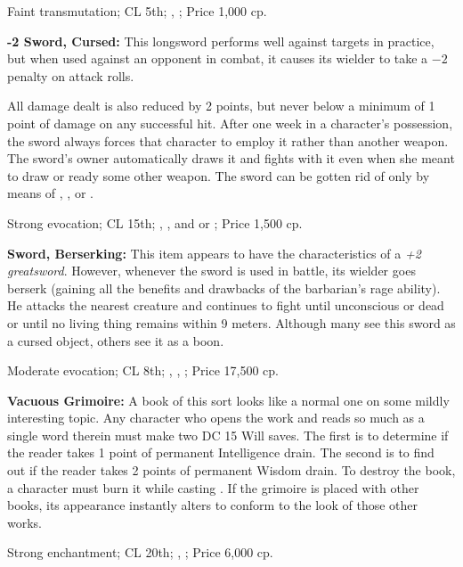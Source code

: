 Faint transmutation; CL 5th; , ; Price 1,000 cp.

\textbf{-2 Sword, Cursed:} This longsword performs well against targets in practice, but when used against an opponent in combat, it causes its wielder to take a $-2$ penalty on attack rolls.

All damage dealt is also reduced by 2 points, but never below a minimum of 1 point of damage on any successful hit. After one week in a character's possession, the sword always forces that character to employ it rather than another weapon. The sword's owner automatically draws it and fights with it even when she meant to draw or ready some other weapon. The sword can be gotten rid of only by means of , , or .

Strong evocation; CL 15th; , , and  or ; Price 1,500 cp.

\textbf{Sword, Berserking:} This item appears to have the characteristics of a \emph{+2 greatsword}. However, whenever the sword is used in battle, its wielder goes berserk (gaining all the benefits and drawbacks of the barbarian's rage ability). He attacks the nearest creature and continues to fight until unconscious or dead or until no living thing remains within 9 meters. Although many see this sword as a cursed object, others see it as a boon.

Moderate evocation; CL 8th; , , ; Price 17,500 cp.

\textbf{Vacuous Grimoire:} A book of this sort looks like a normal one on some mildly interesting topic. Any character who opens the work and reads so much as a single word therein must make two DC 15 Will saves. The first is to determine if the reader takes 1 point of permanent Intelligence drain. The second is to find out if the reader takes 2 points of permanent Wisdom drain. To destroy the book, a character must burn it while casting . If the grimoire is placed with other books, its appearance instantly alters to conform to the look of those other works.

Strong enchantment; CL 20th; , ; Price 6,000 cp.

